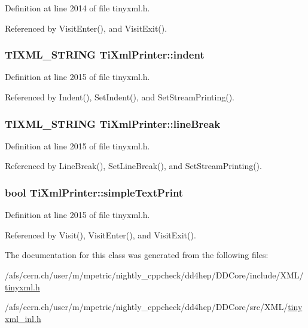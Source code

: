 Definition at line 2014 of file tinyxml.h.

Referenced by VisitEnter(), and VisitExit().\hypertarget{class_ti_xml_printer_a672fda389bb3f5a2ae8ead867f9a2536}{
\subsubsection[{indent}]{\setlength{\rightskip}{0pt plus 5cm}TIXML\_\-STRING {\bf TiXmlPrinter::indent}}}
\label{class_ti_xml_printer_a672fda389bb3f5a2ae8ead867f9a2536}


Definition at line 2015 of file tinyxml.h.

Referenced by Indent(), SetIndent(), and SetStreamPrinting().\hypertarget{class_ti_xml_printer_a25e8120bcfda10cc06a11b2dedcef7fe}{
\subsubsection[{lineBreak}]{\setlength{\rightskip}{0pt plus 5cm}TIXML\_\-STRING {\bf TiXmlPrinter::lineBreak}}}
\label{class_ti_xml_printer_a25e8120bcfda10cc06a11b2dedcef7fe}


Definition at line 2015 of file tinyxml.h.

Referenced by LineBreak(), SetLineBreak(), and SetStreamPrinting().\hypertarget{class_ti_xml_printer_a2dceede5ae9bb8948f1ecaabb24ab2fb}{
\subsubsection[{simpleTextPrint}]{\setlength{\rightskip}{0pt plus 5cm}bool {\bf TiXmlPrinter::simpleTextPrint}}}
\label{class_ti_xml_printer_a2dceede5ae9bb8948f1ecaabb24ab2fb}


Definition at line 2015 of file tinyxml.h.

Referenced by Visit(), VisitEnter(), and VisitExit().

The documentation for this class was generated from the following files:\begin{DoxyCompactItemize}
\item 
/afs/cern.ch/user/m/mpetric/nightly\_\-cppcheck/dd4hep/DDCore/include/XML/\hyperlink{tinyxml_8h}{tinyxml.h}\item 
/afs/cern.ch/user/m/mpetric/nightly\_\-cppcheck/dd4hep/DDCore/src/XML/\hyperlink{tinyxml__inl_8h}{tinyxml\_\-inl.h}\end{DoxyCompactItemize}
